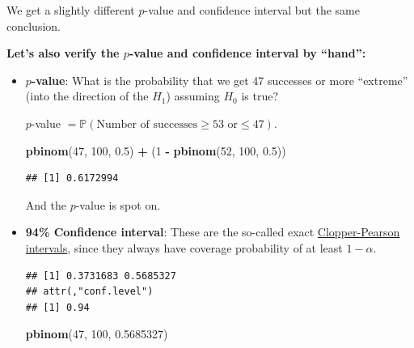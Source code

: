 \documentclass[
]{book}
\newenvironment{Shaded}{\begin{snugshade}}{\end{snugshade}}
\newcommand{\AttributeTok}[1]{\textcolor[rgb]{0.13,0.29,0.53}{#1}}
\newcommand{\DecValTok}[1]{\textcolor[rgb]{0.00,0.00,0.81}{#1}}
\newcommand{\FloatTok}[1]{\textcolor[rgb]{0.00,0.00,0.81}{#1}}
\newcommand{\FunctionTok}[1]{\textcolor[rgb]{0.13,0.29,0.53}{\textbf{#1}}}
\newcommand{\NormalTok}[1]{#1}
\newcommand{\SpecialCharTok}[1]{\textcolor[rgb]{0.81,0.36,0.00}{\textbf{#1}}}
\begin{document}
We get a slightly different \(p\)-value and confidence interval but the same conclusion.

\textbf{Let's also verify the \(p\)-value and confidence interval by ``hand'':}

\begin{itemize}
\item
  \textbf{\(p\)-value}: What is the probability that we get 47 successes
  or more ``extreme'' (into the direction of the \(H_1\)) assuming \(H_0\) is true?

  \(p\)-value \(=\mathbb{P}(\text{Number of successes} \ge 53 \text{ or} \le 47)\).

\begin{Shaded}
\begin{Highlighting}[]
\FunctionTok{pbinom}\NormalTok{(}\DecValTok{47}\NormalTok{, }\DecValTok{100}\NormalTok{, }\FloatTok{0.5}\NormalTok{) }\SpecialCharTok{+}\NormalTok{ (}\DecValTok{1} \SpecialCharTok{{-}} \FunctionTok{pbinom}\NormalTok{(}\DecValTok{52}\NormalTok{, }\DecValTok{100}\NormalTok{, }\FloatTok{0.5}\NormalTok{))}
\end{Highlighting}
\end{Shaded}

\begin{verbatim}
## [1] 0.6172994
\end{verbatim}

  And the \(p\)-value is spot on.
\item
  \textbf{94\% Confidence interval}: These are the so-called exact \href{https://en.wikipedia.org/wiki/Binomial_proportion_confidence_interval\#Clopper\%E2\%80\%93Pearson_interval}{Clopper-Pearson intervals},
  since they always have coverage probability of at least \(1 - \alpha\).

\begin{Shaded}
\end{Shaded}

\begin{verbatim}
## [1] 0.3731683 0.5685327
## attr(,"conf.level")
## [1] 0.94
\end{verbatim}

\begin{Shaded}
\begin{Highlighting}[]
\FunctionTok{pbinom}\NormalTok{(}\DecValTok{47}\NormalTok{, }\DecValTok{100}\NormalTok{, }\FloatTok{0.5685327}\NormalTok{)}
\end{Highlighting}
\end{Shaded}


\end{itemize}
\end{document}
